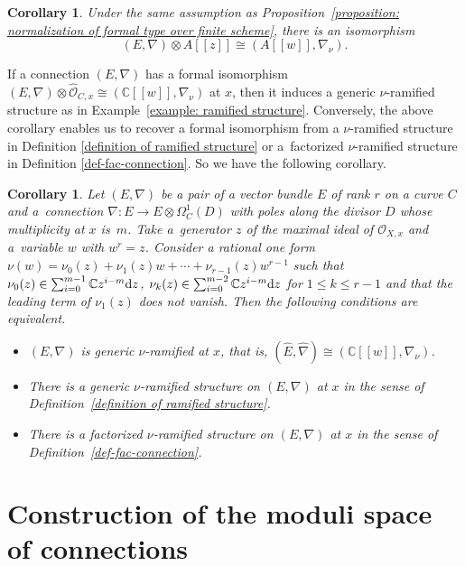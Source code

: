 \documentclass[pdftex]{sigma}
\numberwithin{equation}{section}
\newtheorem{Corollary}[Theorem]{Corollary}
\begin{document}
\begin{Corollary} \label{corollary: formal structure}
Under the same assumption as
Proposition~{\rm \ref{proposition: normalization of formal type over finite scheme}},
there is an isomorphism
\[
 (E,\nabla)\otimes A[[z]]
 \cong (A[[w]],\nabla_{\nu}).
\]
\end{Corollary}

If a connection $(E,\nabla)$ has a formal isomorphism
$(E,\nabla)\otimes\widehat{\mathcal O}_{C,x}\cong
(\mathbb{C}[[w]],\nabla_{\nu})$ at $x$,
then it induces a generic $\nu$-ramified structure
as in Example~\ref{example: ramified structure}.
Conversely, the above corollary enables us to
recover a formal isomorphism
from a $\nu$-ramified structure in
Definition \ref{definition of ramified structure}
or a~factorized $\nu$-ramified structure in
Definition \ref{def-fac-connection}.
So we have the following corollary.

\begin{Corollary}\label{corollary: 3 conditions are equivalent}
Let $(E,\nabla)$ be a pair of a vector bundle $E$ of rank $r$ on a curve $C$
and a~connection $\nabla\colon E \longrightarrow E\otimes\Omega^1_C(D)$
with poles along the divisor $D$ whose multiplicity at $x$ is~$m$.
Take a~generator $z$ of the maximal ideal of ${\mathcal O}_{X,x}$
and a~variable $w$ with $w^r=z$.
Consider a rational one form
$\nu(w)=\nu_0(z)+\nu_1(z)w+\cdots+\nu_{r-1}(z)w^{r-1}$
such that
$\nu_0(z)\in\sum_{i=0}^{m-1}\mathbb{C}z^{i-m}{\rm d}z$,
$\nu_k(z)\in \sum_{i=0}^{m-2}\mathbb{C}z^{i-m}{\rm d}z$
for $1\leq k\leq r-1$
and that the leading term of $\nu_1(z)$ does not vanish.
Then the following conditions are equivalent.
\begin{itemize}\itemsep=0pt
\item[$(1)$]
$(E,\nabla)$ is generic $\nu$-ramified at $x$, that is,
$(\widehat{E},\widehat{\nabla})\cong (\mathbb{C}[[w]],\nabla_{\nu})$.
\item[$(2)$]
There is a generic $\nu$-ramified structure on $(E,\nabla)$ at $x$
in the sense of Definition~{\rm \ref{definition of ramified structure}}.
\item[$(3)$]
There is a factorized $\nu$-ramified structure on $(E,\nabla)$ at $x$
in the sense of Definition~{\rm \ref{def-fac-connection}}.
\end{itemize}
\end{Corollary}

\section{Construction of the moduli space of connections}\label{section: construction of the moduli space}
\end{document}
